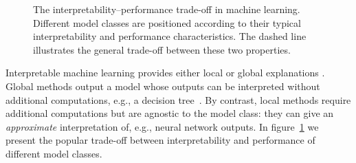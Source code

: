 \begin{figure}[htbp]
    \centering
    \caption{The interpretability–performance trade-off in machine learning. Different model classes are positioned according to their typical interpretability and performance characteristics. The dashed line illustrates the general trade-off between these two properties.}
    \label{fig:interpretability-performance-tradeoff}
\end{figure}
Interpretable machine learning provides either local or global explanations \cite{glanois-survey}.
Global methods output a model whose outputs can be interpreted without additional computations, e.g., a decision tree~\cite{breiman1984classification}. By contrast, local methods require additional computations but are agnostic to the model class: they can give an \textit{approximate} interpretation of, e.g., neural network outputs.
In figure~\ref{fig:interpretability-performance-tradeoff} we present the popular trade-off between interpretability and performance of different model classes.

